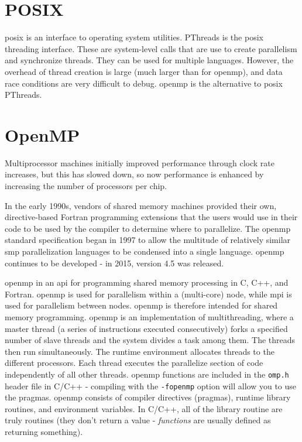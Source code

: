 \documentclass[10pt]{article}
\begin{document}
\begin{flushleft}
\section{POSIX}

\gls{posix} is an interface to operating system utilities. PThreads is the \gls{posix} threading interface. These are system-level calls that are use to create parallelism and synchronize threads. They can be used for multiple languages. However, the overhead of thread creation is large (much larger than for \gls{openmp}), and data race conditions are very difficult to debug. \gls{openmp} is the alternative to \gls{posix} PThreads.
 
\section{OpenMP}

Multiprocessor machines initially improved performance through clock rate increases, but this has slowed down, so now performance is enhanced by increasing the number of processors per chip.

In the early 1990s, vendors of shared memory machines provided their own, directive-based Fortran programming extensions that the users would use in their code to be used by the compiler to determine where to parallelize. The \gls{openmp} standard specification began in 1997 to allow the multitude of relatively similar \gls{smp} parallelization languages to be condensed into a single language. \gls{openmp} continues to be developed - in 2015, version 4.5 was released.

\gls{openmp} in an \gls{api} for programming shared memory processing in C, C++, and Fortran. \gls{openmp} is used for parallelism within a (multi-core) node, while \gls{mpi} is used for parallelism between nodes. \gls{openmp} is therefore intended for shared memory programming. \gls{openmp} is an implementation of multithreading, where a master thread (a series of instructions executed consecutively) forks a specified number of slave threads and the system divides a task among them. The threads then run simultaneously. The runtime environment allocates threads to the different processors. Each thread executes the parallelize section of code independently of all other threads. \gls{openmp} functions are included in the {\tt omp.h} header file in C/C++ - compiling with the {\tt -fopenmp} option will allow you to use the pragmas. \gls{openmp} consists of compiler directives (pragmas), runtime library routines, and environment variables. In C/C++, all of the library routine are truly routines (they don't return a value - \textit{functions} are usually defined as returning something). 


\end{flushleft}
\end{document}

